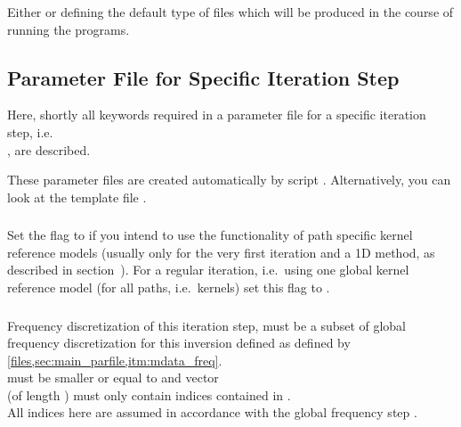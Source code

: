 \subsubsection{} 
Either  or  defining the default type of  files 
which will be produced in the course of running the programs.
%
\subsection{Parameter File for Specific Iteration Step} \label{files,sec:iter_parfile}
%
Here, shortly all keywords required in a parameter file for a specific iteration step, i.e.\ \\
 , are described.

These parameter files are created automatically by script . 
Alternatively, you can look at the template file .
\subsubsection{}
Set the flag to  if you intend to use the \ASKI{} functionality of path specific kernel 
reference models (usually only for the very first iteration and a 1D method, as described in 
section~). For a regular iteration, i.e.\ using one 
global kernel reference model (for all paths, i.e.\ kernels) set this flag to .
\subsubsection{} \label{files,sec:iter_parfile,itm:iter_freq}
Frequency discretization of this iteration step, must be a subset of global frequency discretization 
for this inversion defined as defined by \ref{files,sec:main_parfile,itm:mdata_freq}. \\
 must be smaller or equal to  and vector \\
 (of length )
must only contain indices contained in .\\
All indices here are assumed in accordance with the global frequency step .
